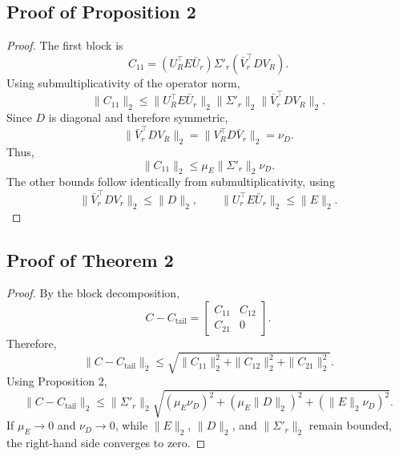 \documentclass{article}
\begin{document}
\subsection{Proof of Proposition 2}
\label{app:proof-proposition-2-scaler-induces-mixing-bounds}
\begin{proof}
The first block is
\[
C_{11}
=
(U_R^\top E \bar{U}_r)\Sigma'_r(\bar{V}_r^\top D V_R).
\]
Using submultiplicativity of the operator norm,
\[
\|C_{11}\|_2
\leq
\|U_R^\top E \bar{U}_r\|_2
\|\Sigma'_r\|_2
\|\bar{V}_r^\top D V_R\|_2 .
\]
Since $D$ is diagonal and therefore symmetric,
\[
\|\bar{V}_r^\top D V_R\|_2
=
\|V_R^\top D \bar{V}_r\|_2
=
\nu_D .
\]
Thus,
\[
\|C_{11}\|_2
\leq
\mu_E \|\Sigma'_r\|_2 \nu_D .
\]
The other bounds follow identically from submultiplicativity, using
\[
\|\bar{V}_r^\top D V_r\|_2 \leq \|D\|_2,
\qquad
\|U_r^\top E \bar{U}_r\|_2 \leq \|E\|_2 .
\]
\end{proof}


\subsection{Proof of Theorem 2}
\label{app:proof-thm-2-approximate-tail-preservation}
\begin{proof}
By the block decomposition,
\[
C-C_{\mathrm{tail}}
=
\begin{bmatrix}
C_{11} & C_{12} \\
C_{21} & 0
\end{bmatrix}.
\]
Therefore,
\[
\|C-C_{\mathrm{tail}}\|_2
\leq
\sqrt{
\|C_{11}\|_2^2
+
\|C_{12}\|_2^2
+
\|C_{21}\|_2^2
}.
\]
Using Proposition 2,
\[
\|C-C_{\mathrm{tail}}\|_2
\leq
\|\Sigma'_r\|_2
\sqrt{
(\mu_E\nu_D)^2
+
(\mu_E\|D\|_2)^2
+
(\|E\|_2\nu_D)^2
}.
\]
If $\mu_E\to 0$ and $\nu_D\to 0$, while $\|E\|_2$, $\|D\|_2$, and
$\|\Sigma'_r\|_2$ remain bounded, the right-hand side converges to zero.
\end{proof}

\newpage

\end{document}
